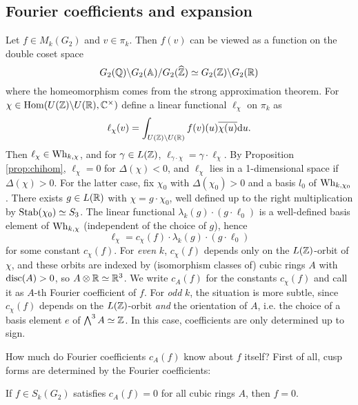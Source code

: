 \subsection{Fourier coefficients and expansion}
\label{subsec:g2modfourier}


Let $f \in M_k(G_2)$ and $v \in \pi_k$.
Then $f(v)$ can be viewed as a function on the double coset space
$$
G_2(\mathbb{Q}) \backslash G_2(\mathbb{A}) / G_2(\widehat{\mathbb{Z}}) \simeq G_2(\mathbb{Z}) \backslash G_2(\mathbb{R})
$$
where the homeomorphism comes from the strong approximation theorem.
For $\chi \in \mathrm{Hom}(U(\mathbb{Z}) \backslash U(\mathbb{R}), \mathbb{C}^\times)$ define a linear functional $\ell_\chi$ on $\pi_k$ as
$$
\ell_\chi(v) = \int_{U(\mathbb{Z}) \backslash U(\mathbb{R})} f(v)(u) \overline{\chi(u)} \mathrm{d} u.
$$
Then $\ell_\chi \in \mathrm{Wh}_{k, \chi}$, and for $\gamma \in L(\mathbb{Z})$, $\ell_{\gamma \cdot \chi} = \gamma \cdot \ell_\chi$.
By Proposition \ref{prop:chihom}, $\ell_\chi = 0$ for $\Delta(\chi) < 0$, and $\ell_\chi$ lies in a 1-dimensional space if $\Delta(\chi) > 0$.
For the latter case, fix $\chi_0$ with $\Delta(\chi_0) > 0$ and a basis $l_0$ of $\mathrm{Wh}_{k, \chi_0}$.
There exists $g \in L(\mathbb{R})$ with $\chi = g \cdot \chi_0$, well defined up to the right multiplication by $\mathrm{Stab}(\chi_0) \simeq S_3$.
The linear functional $\lambda_k(g) \cdot (g \cdot \ell_0)$ is a well-defined basis element of $\mathrm{Wh}_{k, \chi}$ (independent of the choice of $g$), hence
$$
\ell_\chi = c_\chi(f)\cdot \lambda_k(g) \cdot (g \cdot \ell_0)
$$
for some constant $c_\chi(f)$.
For \emph{even} $k$, $c_\chi(f)$ depends only on the $L(\mathbb{Z})$-orbit of $\chi$, and these orbits are indexed by (isomorphism classes of) cubic rings $A$ with $\mathrm{disc}(A) > 0$, so $A \otimes \mathbb{R} \simeq \mathbb{R}^3$.
We write $c_A(f)$ for the constants $c_\chi(f)$ and call it as $A$-th Fourier coefficient of $f$.
For \emph{odd} $k$, the situation is more subtle, since $c_\chi(f)$ depends on the $L(\mathbb{Z})$-orbit \emph{and} the orientation of $A$, i.e. the choice of a basis element $e$ of $\bigwedge^3 A \simeq \mathbb{Z}$.
In this case, coefficients are only determined up to sign.

How much do Fourier coefficients $c_A(f)$ know about $f$ itself?
First of all, cusp forms are determined by the Fourier coefficients:
\begin{proposition}
\label{prop:g2modmult1}
If $f \in S_k(G_2)$ satisfies $c_A(f) = 0$ for all cubic rings $A$, then $f = 0$.
\end{proposition}
    
